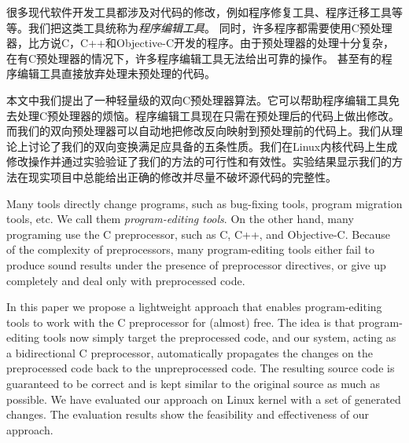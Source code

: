
\begin{cabstract}
很多现代软件开发工具都涉及对代码的修改，例如程序修复工具、程序迁移工具等等。我们把这类工具统称为\emph{程序编辑工具}。
同时，许多程序都需要使用C预处理器，比方说C，C++和Objective-C开发的程序。由于预处理器的处理十分复杂，
在有C预处理器的情况下，许多程序编辑工具无法给出可靠的操作。
甚至有的程序编辑工具直接放弃处理未预处理的代码。

本文中我们提出了一种轻量级的双向C预处理器算法。它可以帮助程序编辑工具免去处理C预处理器的烦恼。程序编辑工具现在只需在预处理后的代码上做出修改。而我们的双向预处理器可以自动地把修改反向映射到预处理前的代码上。我们从理论上讨论了我们的双向变换满足应具备的五条性质。我们在Linux内核代码上生成修改操作并通过实验验证了我们的方法的可行性和有效性。实验结果显示我们的方法在现实项目中总能给出正确的修改并尽量不破坏源代码的完整性。
\end{cabstract}

\begin{eabstract}
Many tools directly change programs, such as bug-fixing tools, program migration tools, etc. We call them \emph{program-editing tools}. On the other hand, many programing use the C preprocessor, such as C, C++, and Objective-C. Because of the complexity of preprocessors, many program-editing tools either fail to produce sound results under the presence of preprocessor directives, or give up completely and deal only with preprocessed code.

In this paper we propose a lightweight approach that enables program-editing tools to work with the C preprocessor for (almost) free. The idea is that program-editing tools now simply target the preprocessed code, and our system, acting as a bidirectional C preprocessor, automatically propagates the changes on the preprocessed code back to the unpreprocessed code. The resulting source code is guaranteed to be correct and is kept similar to the original source as much as possible. We have evaluated our approach on Linux kernel with a set of generated changes. The evaluation results show the feasibility and effectiveness of our approach.
\end{eabstract}

